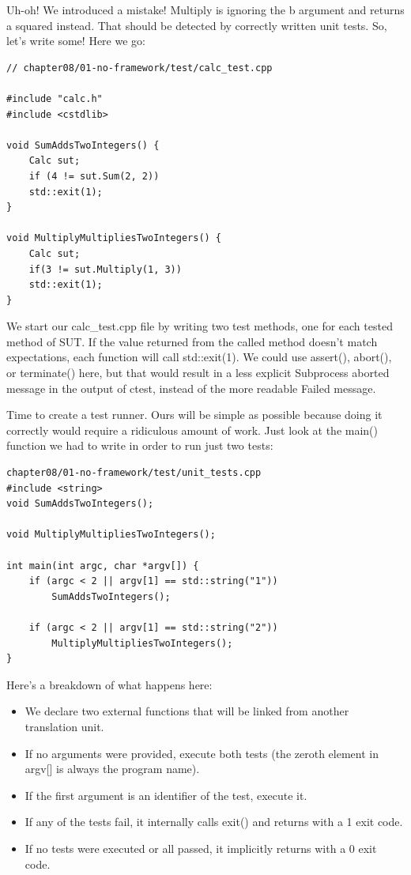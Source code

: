 Uh-oh! We introduced a mistake! Multiply is ignoring the b argument and returns a squared instead. That should be detected by correctly written unit tests. So, let's write some! Here we go:

\begin{lstlisting}[style=styleCXX]
// chapter08/01-no-framework/test/calc_test.cpp

#include "calc.h"
#include <cstdlib>

void SumAddsTwoIntegers() {
	Calc sut;
	if (4 != sut.Sum(2, 2))
	std::exit(1);
}

void MultiplyMultipliesTwoIntegers() {
	Calc sut;
	if(3 != sut.Multiply(1, 3))
	std::exit(1);
}
\end{lstlisting} 

We start our calc\_test.cpp file by writing two test methods, one for each tested method of SUT. If the value returned from the called method doesn't match expectations, each function will call std::exit(1). We could use assert(), abort(), or terminate() here, but that would result in a less explicit Subprocess aborted message in the output of ctest, instead of the more readable Failed message.

Time to create a test runner. Ours will be simple as possible because doing it correctly would require a ridiculous amount of work. Just look at the main() function we had to write in order to run just two tests:

\begin{lstlisting}[style=styleCXX]
chapter08/01-no-framework/test/unit_tests.cpp
#include <string>
void SumAddsTwoIntegers();

void MultiplyMultipliesTwoIntegers();

int main(int argc, char *argv[]) {
	if (argc < 2 || argv[1] == std::string("1"))
		SumAddsTwoIntegers();
	
	if (argc < 2 || argv[1] == std::string("2"))
		MultiplyMultipliesTwoIntegers();
}
\end{lstlisting} 

Here's a breakdown of what happens here:

\begin{itemize}
\item 
We declare two external functions that will be linked from another translation unit.

\item 
If no arguments were provided, execute both tests (the zeroth element in argv[] is always the program name).

\item 
If the first argument is an identifier of the test, execute it.

\item 
If any of the tests fail, it internally calls exit() and returns with a 1 exit code.

\item 
If no tests were executed or all passed, it implicitly returns with a 0 exit code.
\end{itemize}

